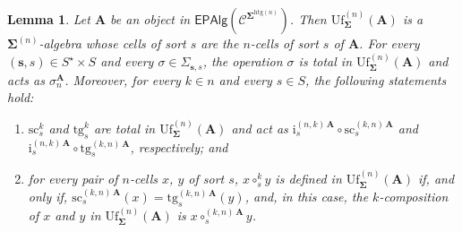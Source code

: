 \documentclass[a4paper, reqno]{amsbook}
\newcommand{\sig}[1]{\mathbf{#1}}             %
\newcommand{\spec}[1]{\boldsymbol{\mathcal{#1}}} %
\newcommand{\htg}{\mathrm{htg}}                %
\newcommand{\src}{\mathrm{sc}}
\newcommand{\tgt}{\mathrm{tg}}
\newcommand{\Uf}{\mathrm{Uf}}
\theoremstyle{plain}
\newtheorem{lemma}[theorem]{Lemma}
\theoremstyle{definition}
\begin{document}
\begin{lemma}\label{LUfDescription}
Let $\mathbf{A}$ be an object in $\mathsf{EPAlg}(\spec{C}^{\sig{\Sigma}^{\htg(n)}})$.
Then $\Uf^{(n)}_{\sig{\Sigma}}(\mathbf{A})$ is a $\sig{\Sigma}^{(n)}$-algebra whose cells of sort $s$ are the $n$-cells of sort $s$ of $\mathbf{A}$.
For every $(\mathbf{s},s)\in S^{\star}\times S$ and every $\sigma\in\Sigma_{\mathbf{s},s}$, the operation $\sigma$ is total in $\Uf^{(n)}_{\sig{\Sigma}}(\mathbf{A})$ and acts as $\sigma_n^{\mathbf{A}}$.
Moreover, for every $k\in n$ and every $s\in S$, the following statements hold:
\begin{enumerate}
\item $\src^{k}_{s}$ and $\tgt^{k}_{s}$ are total in $\Uf^{(n)}_{\sig{\Sigma}}(\mathbf{A})$ and act as $\mathrm{i}^{(n,k)\,\mathbf{A}}_{s}\circ\src^{(k,n)\,\mathbf{A}}_{s}$ and $\mathrm{i}^{(n,k)\,\mathbf{A}}_{s}\circ\tgt^{(k,n)\,\mathbf{A}}_{s}$, respectively; and
\item for every pair of $n$-cells $x$, $y$ of sort $s$, $x\circ^{k}_{s}y$ is defined in $\Uf^{(n)}_{\sig{\Sigma}}(\mathbf{A})$ if, and only if, $\src^{(k,n)\,\mathbf{A}}_{s}(x)=\tgt^{(k,n)\,\mathbf{A}}_{s}(y)$, and, in this case, the $k$-composition of $x$ and $y$ in $\Uf^{(n)}_{\sig{\Sigma}}(\mathbf{A})$ is $x\circ^{(k,n)\,\mathbf{A}}_{s}y$.
\end{enumerate}
\end{lemma}
\end{document}

